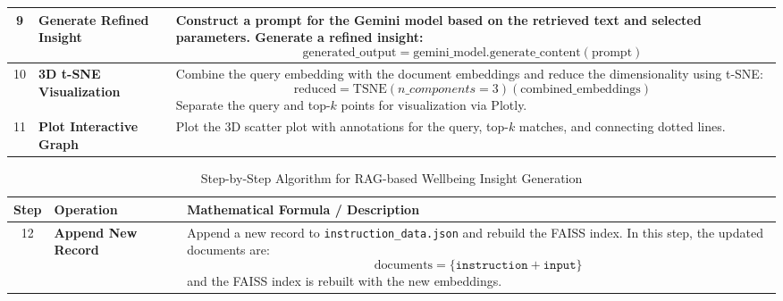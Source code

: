 \begin{table}[H]
\begin{tabularx}{\textwidth}{|c|p{3cm}|X|}
        9 & \textbf{Generate Refined Insight} & Construct a prompt for the Gemini model based on the retrieved text and selected parameters. Generate a refined insight:
        \[
        \text{generated\_output} = \text{gemini\_model.generate\_content}(\text{prompt})
        \] 
        \vspace{-2em}
        \\ \hline
        
        10 & \textbf{3D t-SNE Visualization} & Combine the query embedding with the document embeddings and reduce the dimensionality using t-SNE:
        \[
        \text{reduced} = \text{TSNE}(n\_components=3)(\text{combined\_embeddings})
        \]
        Separate the query and top-\(k\) points for visualization via Plotly. \\ \hline
        
        11 & \textbf{Plot Interactive Graph} & Plot the 3D scatter plot with annotations for the query, top-\(k\) matches, and connecting dotted lines. \\ \hline
    \end{tabularx}
\end{table}

\pagebreak

\begin{table}[H]
    \centering
    \caption*{Step-by-Step Algorithm for RAG-based Wellbeing Insight Generation}
    \label{tab:algorithm}
    \begin{tabularx}{\textwidth}{|c|p{3cm}|X|}
        \hline
        \textbf{Step} & \textbf{Operation} & \textbf{Mathematical Formula / Description} \\ \hline
        12 & \textbf{Append New Record} & Append a new record to \texttt{instruction\_data.json} and rebuild the FAISS index. In this step, the updated documents are:
        \[
        \text{documents} = \{ \texttt{instruction} + \texttt{input} \}
        \]
        and the FAISS index is rebuilt with the new embeddings. \\ \hline
    \end{tabularx}
\end{table}


